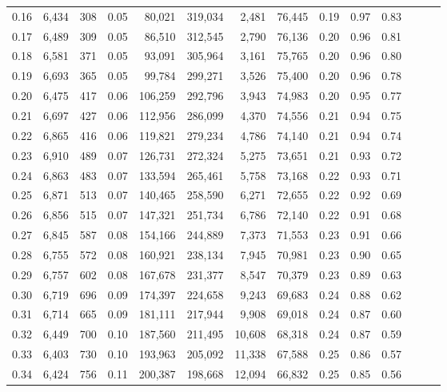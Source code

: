 \begin{tabular}{rrrrrrrrrrrrrr}
0.16 &  6,434 &    308 &  0.05 &   80,021 &  319,034 &   2,481 &  76,445 &  0.19 &  0.97 &      0.83 \\
0.17 &  6,489 &    309 &  0.05 &   86,510 &  312,545 &   2,790 &  76,136 &  0.20 &  0.96 &      0.81 \\
0.18 &  6,581 &    371 &  0.05 &   93,091 &  305,964 &   3,161 &  75,765 &  0.20 &  0.96 &      0.80 \\
0.19 &  6,693 &    365 &  0.05 &   99,784 &  299,271 &   3,526 &  75,400 &  0.20 &  0.96 &      0.78 \\
0.20 &  6,475 &    417 &  0.06 &  106,259 &  292,796 &   3,943 &  74,983 &  0.20 &  0.95 &      0.77 \\
0.21 &  6,697 &    427 &  0.06 &  112,956 &  286,099 &   4,370 &  74,556 &  0.21 &  0.94 &      0.75 \\
0.22 &  6,865 &    416 &  0.06 &  119,821 &  279,234 &   4,786 &  74,140 &  0.21 &  0.94 &      0.74 \\
0.23 &  6,910 &    489 &  0.07 &  126,731 &  272,324 &   5,275 &  73,651 &  0.21 &  0.93 &      0.72 \\
0.24 &  6,863 &    483 &  0.07 &  133,594 &  265,461 &   5,758 &  73,168 &  0.22 &  0.93 &      0.71 \\
0.25 &  6,871 &    513 &  0.07 &  140,465 &  258,590 &   6,271 &  72,655 &  0.22 &  0.92 &      0.69 \\
0.26 &  6,856 &    515 &  0.07 &  147,321 &  251,734 &   6,786 &  72,140 &  0.22 &  0.91 &      0.68 \\
0.27 &  6,845 &    587 &  0.08 &  154,166 &  244,889 &   7,373 &  71,553 &  0.23 &  0.91 &      0.66 \\
0.28 &  6,755 &    572 &  0.08 &  160,921 &  238,134 &   7,945 &  70,981 &  0.23 &  0.90 &      0.65 \\
0.29 &  6,757 &    602 &  0.08 &  167,678 &  231,377 &   8,547 &  70,379 &  0.23 &  0.89 &      0.63 \\
0.30 &  6,719 &    696 &  0.09 &  174,397 &  224,658 &   9,243 &  69,683 &  0.24 &  0.88 &      0.62 \\
0.31 &  6,714 &    665 &  0.09 &  181,111 &  217,944 &   9,908 &  69,018 &  0.24 &  0.87 &      0.60 \\
0.32 &  6,449 &    700 &  0.10 &  187,560 &  211,495 &  10,608 &  68,318 &  0.24 &  0.87 &      0.59 \\
0.33 &  6,403 &    730 &  0.10 &  193,963 &  205,092 &  11,338 &  67,588 &  0.25 &  0.86 &      0.57 \\
0.34 &  6,424 &    756 &  0.11 &  200,387 &  198,668 &  12,094 &  66,832 &  0.25 &  0.85 &      0.56 \\

\end{tabular}
